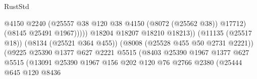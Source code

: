 \begin{lexlean}{RustStd}
\begin{coremodule}
                                                            @4150
                                                            @2240
                                                            (@25557
                                                              @38
                                                              @120
                                                              @38
                                                              @4150
                                                              (@8072 (@25562 @38))
                                                              @17712)
                                                            (@8145 @25491 @1967)))))
                                                    @18204
                                                    @18207
                                                    @18210
                                                    @18213))
                                                (@11135 (@25517 @18))
                                                (@8134 (@25521 @364 @455))
                                                (@8008 (@25528 @455 @50 @2731 @2221))
                                                (@9225
                                                  @25390
                                                  @1377
                                                  @627
                                                  @2221
                                                  @5515
                                                  (@8403
                                                    @25390
                                                    @1967
                                                    @1377
                                                    @627
                                                    @5515
                                                    (@13091
                                                      @25390
                                                      @1967
                                                      @156
                                                      @202
                                                      @120
                                                      @76
                                                      @2766
                                                      @2380
                                                      (@25444
                                                        @645
                                                        @120
                                                        @8436

\end{coremodule}
\end{lexlean}
